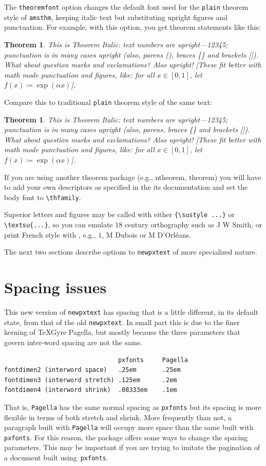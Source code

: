 \documentclass[11pt]{article}
\theoremstyle{oldplain}
\newtheorem{oldthm}{Theorem}[section]
\theoremstyle{plain}
\newtheorem{thm}{Theorem}[section]
\begin{document}
The {\tt theoremfont} option changes the default font used for the {\tt plain} theorem style of {\tt amsthm}, keeping italic text but substituting upright figures and punctuation. For example, with this option, you get theorem statements like this:

\begin{thm}
This is Theorem Italic: text numbers are upright---12345; punctuation is in many cases upright (also, parens (), braces \{\} and brackets []). What about question marks and exclamations? Also upright! [These fit better with math mode punctuation and figures, like: for all $x\in[0,1]$, let $f(x)\coloneq \exp(\alpha x)$].
\end{thm}
Compare this to traditional {\tt plain} theorem style of the same text:
\begin{oldthm}
This is Theorem Italic: text numbers are upright---12345; punctuation is in many cases upright (also, parens, braces \{\} and brackets []). What about question marks and exclamations? Also upright! [These fit better with math mode punctuation and figures, like: for all $x\in[0,1]$, let $f(x)\coloneq \exp(\alpha x)$].
\end{oldthm}

If you are using another theorem package (e.g., ntheorem, theorem) you will have to add your own descriptors as specified in the its documentation and set the body font to \verb|\thfamily|.

Superior letters and figures may be called with either \verb|{\sustyle ...}| or \verb|\textsu{...}|, so you can emulate $18$ century orthography such as J W Smith, or print French style with , e.g., $1$, M Dubois or M D'Orl\'eans.

The next two sections describe options to {\tt newpxtext} of more specialized nature.

\section{Spacing issues}%
This new version of {\tt newpxtext} has spacing that is a little different, in its default state, from that of the old {\tt newpxtext}. In small part this is due to the finer kerning of TeXGyre Pagella, but mostly because the three parameters that govern inter-word spacing are not the same.
\begin{verbatim}
                               pxfonts     Pagella
fontdimen2 (interword space)   .25em       .25em
fontdimen3 (interword stretch) .125em      .2em
fontdimen4 (interword shrink)  .08333em    .1em
\end{verbatim}
That is, {\tt Pagella} has the same normal spacing as {\tt pxfonts} but its spacing is more flexible in terms of both stretch and shrink. More frequently than not, a paragraph built with {\tt Pagella} will occupy more space than the same built with {\tt pxfonts}. For this reason, the package offers some ways to change the spacing parameters. This may be important if you are trying to imitate the pagination of a document built using~{\tt pxfonts}.
\end{document}

